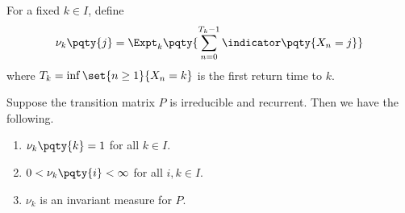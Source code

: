 \begin{definition}
    For a fixed \(k \in I\), define
    \[
        \nu_k \pqty{j} = \Expt_k \pqty{\sum_{n = 0}^{T_k - 1} \indicator\pqty{X_n = j}}
    \]
    where \(T_k = \inf\set{n \geq 1}{X_n = k}\) is the first return time to \(k\).
\end{definition}

\begin{theorem}[Properties of \(\nu_k\)]
    Suppose the transition matrix \(P\) is irreducible and recurrent. Then we have the following.

    \begin{enumerate}[label=(\roman*)]
        \item \(\nu_k \pqty{k} = 1\) for all \(k \in I\).
        \item \(0 < \nu_k \pqty{i} < \infty\) for all \(i, k \in I\).
        \item \(\nu_k\) is an invariant measure for \(P\).
    \end{enumerate}
\end{theorem}

